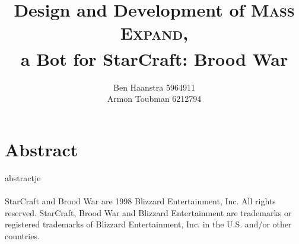 \documentclass[11pt,a4paper,oneside]{book} %
\title{\huge Design and Development of \textsc{Mass Expand},\\ a Bot for StarCraft\textsuperscript{\small \textregistered}: Brood War\textsuperscript{\small \textregistered}}
\author{Ben Haanstra 5964911\\
Armon Toubman 6212794}
\begin{document}
\maketitle






\chapter*{\centering Abstract}
abstractje
\\
\\


\noindent{}StarCraft and Brood War are \textcopyright{}1998 Blizzard Entertainment, Inc. All rights reserved. StarCraft, Brood War and Blizzard Entertainment are trademarks or registered trademarks of Blizzard Entertainment, Inc. in the U.S. and/or other countries.
\pagestyle{empty}
\clearpage

\frontmatter

\tableofcontents



\mainmatter

\pagestyle{fancy}
















\backmatter


\end{document}
